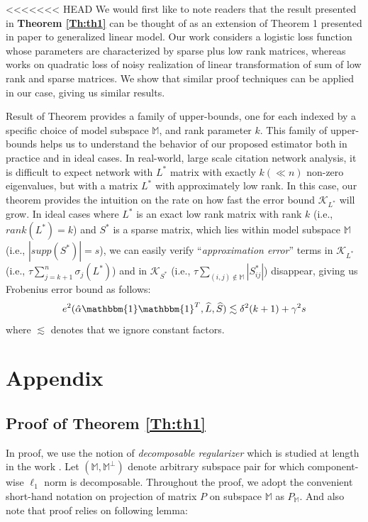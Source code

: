 \documentclass[AMS,STIX1COL]{WileyNJD-v2}
\begin{document}
<<<<<<< HEAD
We would first like to note readers that the result presented in \textbf{Theorem \ref{Th:th1}} can be thought of as an extension of Theorem 1 presented in paper \cite{agarwal2012noisy} to generalized linear model. 
Our work considers a logistic loss function whose parameters are characterized by sparse plus low rank matrices, whereas \cite{agarwal2012noisy} works on quadratic loss of noisy realization of linear transformation of sum of low rank and sparse matrices. 
We show that similar proof techniques can be applied in our case, giving us similar results.

Result of Theorem provides a family of upper-bounds, one for each indexed by a specific choice of model subspace $\mathbb{M}$, and rank parameter $k$. This family of upper-bounds helps us to understand the behavior of our proposed estimator both in practice and in ideal cases. In real-world, large scale citation network analysis, it is difficult to expect network with $L^*$ matrix with exactly $k(\ll n)$ non-zero eigenvalues, but with a matrix $L^*$ with approximately low rank.
In this case, our theorem provides the intuition on the rate on how fast the error bound $\mathcal{K}_{L^*}$ will grow.  
In ideal cases where $L^*$ is an exact low rank matrix with rank $k$ (i.e., $rank(L^*)=k$) and $S^*$ is a sparse matrix, which lies within model subspace $\mathbb{M}$ (i.e., $|supp(S^*)|=s$), we can easily verify ``\emph{approximation error}'' terms in $\mathcal{K}_{L^*}$ (i.e., $\tau\sum_{j=k+1}^{n}\sigma_j(L^*)$) and in $\mathcal{K}_{S^*}$ (i.e., $\tau\sum_{(i,j)\notin \mathbb{M}}|S_{ij}^*|$) disappear, giving us Frobenius error bound as follows:
\[
    e^{2}(\hat{\alpha}\mathbbm{1}\mathbbm{1}^T,\widehat{L},\widehat{S}) \lesssim \delta^2(k+1)+\gamma^2s
\]
where $\lesssim$ denotes that we ignore constant factors.

\section{Appendix}
\subsection{Proof of Theorem \ref{Th:th1}}

In proof, we use the notion of \emph{decomposable regularizer} which is studied at length in the work \cite{negahban2012unified}. Let $(\mathbb{M},\mathbb{M}^{\perp})$ denote arbitrary subspace pair for which component-wise $\ell_{1}$ norm is decomposable. Throughout the proof, we adopt the convenient short-hand notation on projection of matrix $P$ on subspace $\mathbb{M}$ as $P_{\mathbb{M}}$. And also note that proof relies on following lemma:
\end{document}
